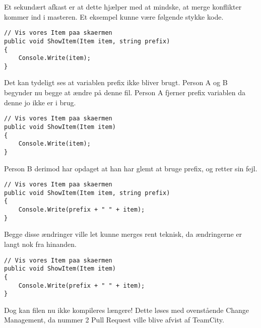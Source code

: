 Et sekundært afkast er at dette hjælper med at mindske, at merge konflikter kommer ind i masteren. Et eksempel kunne være følgende stykke kode.
\begin{lstlisting}
// Vis vores Item paa skaermen
public void ShowItem(Item item, string prefix)
{
    Console.Write(item);
}
\end{lstlisting}
Det kan tydeligt ses at variablen prefix ikke bliver brugt. Person A og B begynder nu begge at ændre på denne fil. Person A fjerner prefix variablen da denne jo ikke er i brug.
\begin{lstlisting}
// Vis vores Item paa skaermen
public void ShowItem(Item item)
{
    Console.Write(item);
}
\end{lstlisting}
Person B derimod har opdaget at han har glemt at bruge prefix, og retter sin fejl.
\begin{lstlisting}
// Vis vores Item paa skaermen
public void ShowItem(Item item, string prefix)
{
    Console.Write(prefix + " " + item);
}
\end{lstlisting}
Begge disse ændringer ville let kunne merges rent teknisk, da ændringerne er langt nok fra hinanden.
\begin{lstlisting}
// Vis vores Item paa skaermen
public void ShowItem(Item item)
{
    Console.Write(prefix + " " + item);
}
\end{lstlisting}
Dog kan filen nu ikke kompileres længere! Dette løses med ovenstående Change Management, da nummer 2 Pull Request ville blive afvist af TeamCity. 
